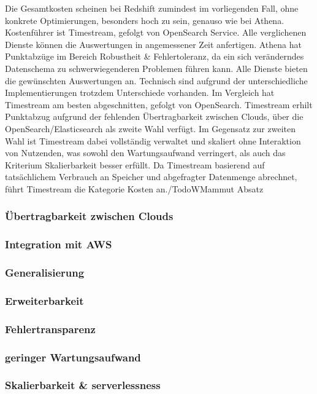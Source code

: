 Die Gesamtkosten scheinen bei Redshift zumindest im vorliegenden Fall, ohne konkrete Optimierungen, besonders hoch zu sein, genauso wie bei Athena. Kostenführer ist Timestream, gefolgt von OpenSearch Service.
Alle verglichenen Dienste können die Auswertungen in angemessener Zeit anfertigen. 
Athena hat Punktabzüge im Bereich Robustheit \& Fehlertoleranz, da ein sich veränderndes Datenschema zu schwerwiegenderen Problemen führen kann.
Alle Dienste bieten die gewünschten Auswertungen an. Technisch sind aufgrund der unterschiedliche Implementierungen trotzdem Unterschiede vorhanden. 
Im Vergleich hat Timestream am besten abgeschnitten, gefolgt von OpenSearch. Timestream erhilt Punktabzug aufgrund der fehlenden Übertragbarkeit zwischen Clouds, über die OpenSearch/Elasticsearch als zweite Wahl verfügt. Im Gegensatz zur zweiten Wahl ist Timestream dabei vollständig verwaltet und skaliert ohne Interaktion von Nutzenden, was sowohl den Wartungsaufwand verringert, als auch das Kriterium Skalierbarkeit besser erfüllt. Da Timestream basierend auf tatsächlichem Verbrauch an Speicher und abgefragter Datenmenge abrechnet, führt Timestream die Kategorie Kosten an./TodoW{Mammut Absatz}

\subsubsection{Übertragbarkeit zwischen Clouds}
\subsubsection{Integration mit AWS}
\subsubsection{Generalisierung}
\subsubsection{Erweiterbarkeit}
\subsubsection{Fehlertransparenz}
\subsubsection{geringer Wartungsaufwand}
\subsubsection{Skalierbarkeit \& serverlessness}
